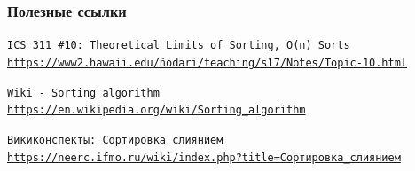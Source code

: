 \documentclass[10pt]{beamer}
\begin{document}
\begin{frame}[allowframebreaks]
  \frametitle<presentation>{Полезные ссылки}
    
  \begin{thebibliography}{10}
{
  \beamertemplatearticlebibitems
  
  \texttt{ICS 311 \#10: Theoretical Limits of Sorting, O(n) Sorts}
  \newblock \href{https://www2.hawaii.edu/\~nodari/teaching/s17/Notes/Topic-10.html}{\texttt{https://www2.hawaii.edu/\~nodari/teaching/s17/Notes/Topic-10.html}}
  
  \texttt{Wiki - Sorting algorithm}
  \newblock \href{https://en.wikipedia.org/wiki/Sorting\_algorithm}{\texttt{https://en.wikipedia.org/wiki/Sorting\_algorithm}}
  
    
  \texttt{Викиконспекты: Сортировка слиянием}
  \newblock \href{https://bit.ly/2DH6XmF}{\texttt{https://neerc.ifmo.ru/wiki/index.php?title=Сортировка_слиянием}}
  


}


  \end{thebibliography}
\end{frame}
\end{document}

